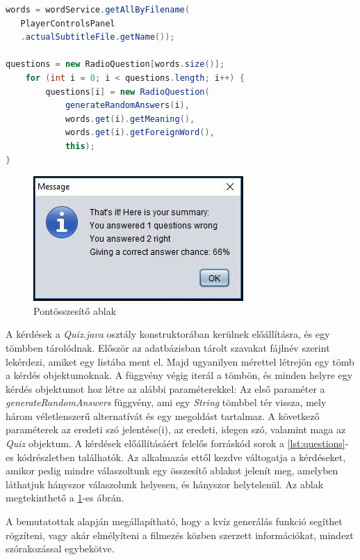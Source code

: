 \begin{spacing}{1.25}
\begin{lstlisting}[caption=Kérdések előállítása, language=java, label={lst:questions}]
words = wordService.getAllByFilename(
   PlayerControlsPanel
   .actualSubtitleFile.getName());

questions = new RadioQuestion[words.size()];
    for (int i = 0; i < questions.length; i++) {
        questions[i] = new RadioQuestion(
            generateRandomAnswers(i),
            words.get(i).getMeaning(),
            words.get(i).getForeignWord(),
            this);
}
\end{lstlisting}
\end{spacing}

  \begin{figure}[h!]
\centering
  \includegraphics[width=.5\linewidth]{images/summary.jpg}
  \caption{Pontösszesítő ablak}
  \label{fig:summary}
\end{figure}

 A kérdések a \textit{Quiz.java} osztály konstruktorában kerülnek előállításra, és egy tömbben tárolódnak. Először az adatbázisban tárolt szavakat fájlnév szerint lekérdezi, amiket egy listába ment el. Majd ugyanilyen mérettel létrejön egy tömb a kérdés objektumoknak. A függvény végig iterál a tömbön, és minden helyre egy kérdés objektumot hoz létre az alábbi paraméterekkel: Az első paraméter a \textit{generateRandomAnswers} függvény, ami egy \textit{String} tömbbel tér vissza, mely három véletlenszerű alternatívát és egy megoldást tartalmaz. A következő paraméterek az eredeti szó jelentése(i), az eredeti, idegen szó, valamint maga az \textit{Quiz} objektum. A kérdések előállításáért felelős forráskód sorok a \ref{lst:questions}-es kódrészletben találhatók. Az alkalmazás ettől kezdve váltogatja a kérdéseket, amikor pedig mindre válaszoltunk egy összesítő ablakot jelenít meg, amelyben láthatjuk hányszor válaszolunk helyesen, és hányszor helytelenül. Az ablak megtekinthető a \ref{fig:summary}-es ábrán.
 

A bemutatottak alapján megállapítható, hogy a kvíz generálás funkció segíthet rögzíteni, vagy akár elmélyíteni a filmezés közben szerzett információkat, mindezt szórakozással egybekötve.
